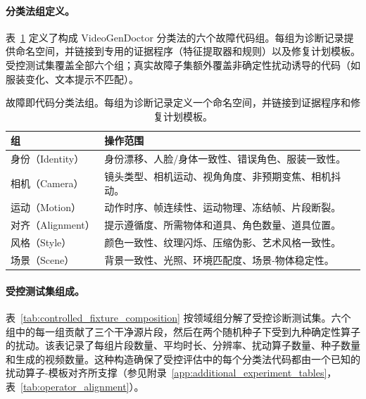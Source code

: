 \documentclass{article}
\begin{document}
\paragraph{分类法组定义。}
表~\ref{tab:failure_taxonomy_groups} 定义了构成 VideoGenDoctor 分类法的六个故障代码组。每组为诊断记录提供命名空间，并链接到专用的证据程序（特征提取器和规则）以及修复计划模板。受控测试集覆盖全部六个组；真实故障子集额外覆盖非确定性扰动诱导的代码（如服装变化、文本提示不匹配）。

\begin{table}[t]
\centering
\small
\caption{故障即代码分类法组。每组为诊断记录定义一个命名空间，并链接到证据程序和修复计划模板。}
\label{tab:failure_taxonomy_groups}
\begin{tabular}{p{}p{}}
\toprule
\textbf{组} & \textbf{操作范围} \\
\midrule
身份（Identity） & 身份漂移、人脸/身体一致性、错误角色、服装一致性。 \\
相机（Camera） & 镜头类型、相机运动、视角角度、非预期变焦、相机抖动。 \\
运动（Motion） & 动作时序、帧连续性、运动物理、冻结帧、片段断裂。 \\
对齐（Alignment） & 提示遵循度、所需物体和道具、角色数量、道具位置。 \\
风格（Style） & 颜色一致性、纹理闪烁、压缩伪影、艺术风格一致性。 \\
场景（Scene） & 背景一致性、光照、环境匹配度、场景-物体稳定性。 \\
\bottomrule
\end{tabular}
\end{table}

\paragraph{受控测试集组成。}
表~\ref{tab:controlled_fixture_composition} 按领域组分解了受控诊断测试集。六个组中的每一组贡献了三个干净源片段，然后在两个随机种子下受到九种确定性算子的扰动。该表记录了每组片段数量、平均时长、分辨率、扰动算子数量、种子数量和生成的视频数量。这种构造确保了受控评估中的每个分类法代码都由一个已知的扰动算子-模板对齐所支撑（参见附录~\ref{app:additional_experiment_tables}，表~\ref{tab:operator_alignment}）。
\end{document}
